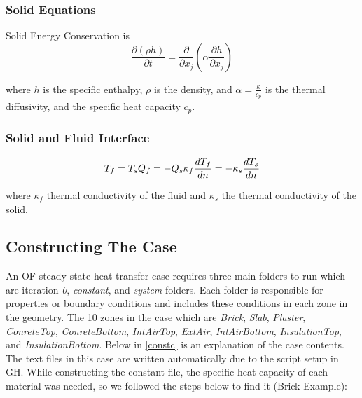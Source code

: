 \subsubsection{Solid Equations}
Solid Energy Conservation is \begin{equation}
\frac{\partial (\rho h)}{\partial t} = \frac{\partial}{\partial x_j}\left( \alpha \frac{\partial h}{\partial x_j} \right)
\end{equation}

where \( h \) is the specific enthalpy, \( \rho \) is the density, and \( \alpha = \frac{\kappa}{c_p} \) is the thermal diffusivity, and the specific heat capacity \( c_p \). 


\subsubsection{Solid and Fluid Interface}
\begin{equation}
T_f = T_s  \\
Q_f = -Q_s  \\
\kappa_f \frac{d T_f}{d n} = -\kappa_s \frac{d T_s}{d n} 
\end{equation}

where \( \kappa_f \) thermal conductivity of the fluid and \( \kappa_s \)  the thermal conductivity of the solid.


\subsection{Constructing The Case}    
An OF steady state heat transfer case requires three main folders to run which are iteration \textit{0}, \textit{constant}, and \textit{system} folders. Each folder is responsible for properties or boundary conditions and includes these conditions in each zone in the geometry. The 10 zones in the case which are \textit{Brick}, \textit{Slab}, \textit{Plaster}, \textit{ConreteTop}, \textit{ConreteBottom}, \textit{IntAirTop}, \textit{ExtAir}, \textit{IntAirBottom}, \textit{InsulationTop}, and \textit{InsulationBottom}. Below in \cref{constc} is an explanation of the case contents. The text files in this case are written automatically due to the script setup in GH. While constructing the constant file, the specific heat capacity of each material was needed, so we followed the steps below to find it (Brick Example):

